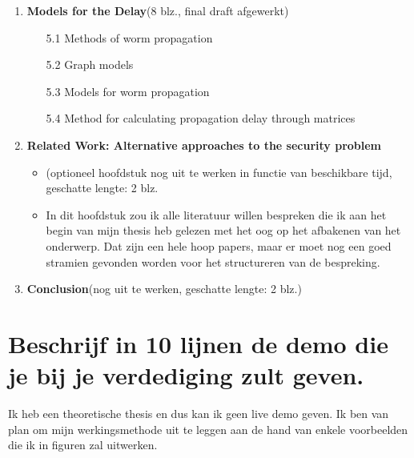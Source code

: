 \documentclass[a4paper, 11pt]{article}
\begin{document}
\begin{enumerate}
\begin{itemize}
\end{itemize}
\item\textbf{Models for the Delay}(8 blz., final draft afgewerkt)
\begin{itemize}
\item[5.1] Methods of worm propagation
\item[5.2] Graph models
\item[5.3] Models for worm propagation
\item[5.4] Method for calculating propagation delay through matrices
\end{itemize}
\item \textbf{Related Work: Alternative approaches to the security problem}  
\begin{itemize}
\item (optioneel hoofdstuk nog uit te werken in functie van beschikbare tijd, geschatte lengte: 2 blz.
\item In dit hoofdstuk zou ik alle literatuur willen bespreken die ik aan het begin van mijn thesis heb gelezen met het oog op het afbakenen van het onderwerp.  Dat zijn een hele hoop papers, maar er moet nog een goed stramien gevonden worden voor het structureren van de bespreking.
\end{itemize}
\item \textbf{Conclusion}(nog uit te werken, geschatte lengte: 2 blz.) 
\end{enumerate}

\section{Beschrijf in 10 lijnen de demo die je bij je verdediging zult geven.}
Ik heb een theoretische thesis en dus kan ik geen live demo geven. Ik ben van plan om mijn werkingsmethode uit te leggen aan de hand van enkele voorbeelden die ik in figuren zal uitwerken.
\end{document}
